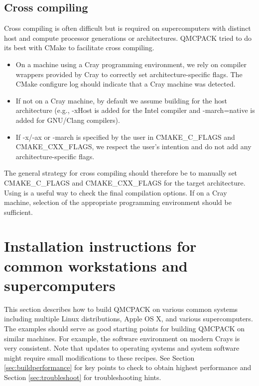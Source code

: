 \subsection{Cross compiling}
Cross compiling is often difficult but is required on supercomputers
with distinct host and compute processor generations or architectures.
QMCPACK tried to do its best with CMake to facilitate cross compiling.

\begin{itemize}
  \item On a machine using a Cray programming environment, we rely on
      compiler wrappers provided by Cray to correctly set architecture-specific
      flags. The CMake configure log should indicate that a
      Cray machine was detected.
  \item If not on a Cray machine, by default we assume building for
    the host architecture (e.g., -xHost is added for the Intel compiler
    and -march=native is added for GNU/Clang compilers).
  \item If -x/-ax or -march is specified by the user in CMAKE\_C\_FLAGS and CMAKE\_CXX\_FLAGS,
    we respect the user's intention and do not add any architecture-specific flags.
\end{itemize}

The general strategy for cross compiling should therefore be to
manually set CMAKE\_C\_FLAGS and CMAKE\_CXX\_FLAGS for the target
architecture. Using  is a useful way to check the
final compilation options.  If on a Cray machine, selection of the
appropriate programming environment should be sufficient.

\section{Installation instructions for common workstations and
  supercomputers}
\label{sec:installexamples}

This section describes how to build QMCPACK on various common systems
including multiple Linux distributions, Apple OS X, and various
supercomputers. The examples should serve as good starting points for
building QMCPACK on similar machines. For example, the software
environment on modern Crays is very consistent. Note that updates to
operating systems and system software might require small modifications
to these recipes. See Section \ref{sec:buildperformance} for key
points to check to obtain highest performance and
Section \ref{sec:troubleshoot} for troubleshooting hints.

